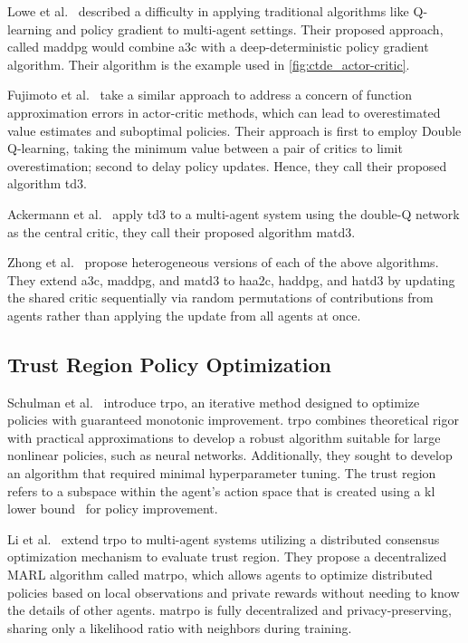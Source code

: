 Lowe et al.~\cite{lowe2020} described a difficulty in applying traditional 
algorithms like Q-learning and policy gradient to multi-agent settings.
Their proposed approach, called \gls{maddpg} would combine \gls{a3c} 
with a deep-deterministic policy gradient algorithm.
Their algorithm is the example used in \cref{fig:ctde_actor-critic}.

Fujimoto et al.~\cite{fujimoto2018} take a similar approach to address 
a concern of function approximation errors in actor-critic methods, 
which can lead to overestimated value estimates and suboptimal policies.
Their approach is first to employ Double Q-learning, taking the 
minimum value between a pair of critics to limit overestimation;
second to delay policy updates. 
Hence, they call their proposed algorithm \gls*{td3}.

Ackermann et al.~\cite{ackermann2019} apply \gls{td3} to 
a multi-agent system using the double-Q network as the central
critic, they call their proposed algorithm \gls{matd3}.

Zhong et al.~\cite{zhong2024} propose heterogeneous versions of each
of the above algorithms.
They extend \gls{a3c}, \gls{maddpg}, and \gls{matd3}
to \gls{haa2c}, \gls{haddpg}, and \gls{hatd3}
by updating the shared critic 
sequentially via random permutations of contributions from agents
rather than applying the update from all agents at once.

    \subsection*{Trust Region Policy Optimization}

Schulman et al.~\cite{schulman2017} introduce \gls{trpo}, an iterative 
method designed to optimize policies with guaranteed monotonic improvement. 
\Gls{trpo} combines theoretical rigor with practical approximations to 
develop a robust algorithm suitable for large nonlinear policies, 
such as neural networks. Additionally, they sought to develop 
an algorithm that required minimal hyperparameter tuning.
%
The trust region refers to a subspace within the agent's action
space that is created using a \gls{kl} lower bound~%
\cite{kakade2002} for policy improvement.

Li et al.~\cite{li2023c} extend \gls{trpo} to multi-agent systems
utilizing a distributed consensus optimization mechanism to 
evaluate trust region. They propose a decentralized MARL algorithm called 
\gls{matrpo}, which allows agents to optimize 
distributed policies based on local observations and private rewards 
without needing to know the details of other agents. 
\gls{matrpo} is fully decentralized and privacy-preserving, 
sharing only a likelihood ratio with neighbors during training. 

